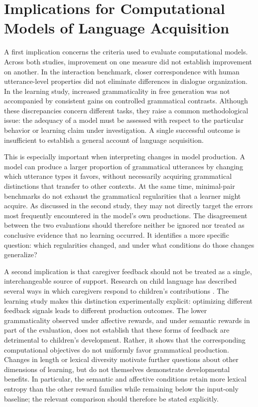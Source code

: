 \section{Implications for Computational Models of Language Acquisition}

A first implication concerns the criteria used to evaluate computational models. Across both studies, improvement on one measure did not establish improvement on another. In the interaction benchmark, closer correspondence with human utterance-level properties did not eliminate differences in dialogue organization. In the learning study, increased grammaticality in free generation was not accompanied by consistent gains on controlled grammatical contrasts. Although these discrepancies concern different tasks, they raise a common methodological issue: the adequacy of a model must be assessed with respect to the particular behavior or learning claim under investigation. A single successful outcome is insufficient to establish a general account of language acquisition.

This is especially important when interpreting changes in model production. A model can produce a larger proportion of grammatical utterances by changing which utterance types it favors, without necessarily acquiring grammatical distinctions that transfer to other contexts. At the same time, minimal-pair benchmarks do not exhaust the grammatical regularities that a learner might acquire. As discussed in the second study, they may not directly target the errors most frequently encountered in the model's own productions. The disagreement between the two evaluations should therefore neither be ignored nor treated as conclusive evidence that no learning occurred. It identifies a more specific question: which regularities changed, and under what conditions do those changes generalize?

A second implication is that caregiver feedback should not be treated as a single, interchangeable source of support. Research on child language has described several ways in which caregivers respond to children's contributions \citep{clark_conversational_2020, nikolaus2023communicative}. The learning study makes this distinction experimentally explicit: optimizing different feedback signals leads to different production outcomes. The lower grammaticality observed under affective rewards, and under semantic rewards in part of the evaluation, does not establish that these forms of feedback are detrimental to children's development. Rather, it shows that the corresponding computational objectives do not uniformly favor grammatical production. Changes in length or lexical diversity motivate further questions about other dimensions of learning, but do not themselves demonstrate developmental benefits. In particular, the semantic and affective conditions retain more lexical entropy than the other reward families while remaining below the input-only baseline; the relevant comparison should therefore be stated explicitly.

